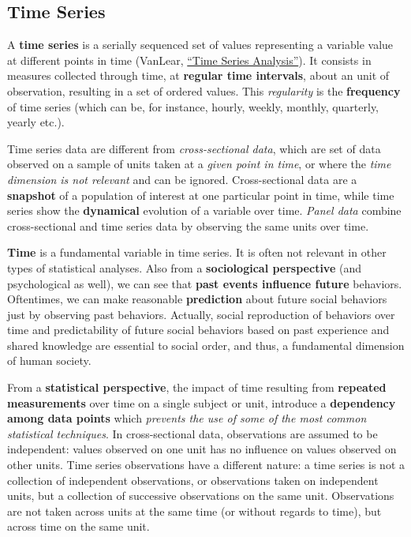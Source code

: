 \documentclass[
]{article}
\begin{document}
\subsection{Time Series}\label{time-series}

A \textbf{time series} is a serially sequenced set of values representing a variable value at different points in time (VanLear, \href{https://us.sagepub.com/en-us/nam/the-sage-encyclopedia-of-communication-research-methods/book244974}{``Time Series Analysis''}). It consists in measures collected through time, at \textbf{regular time intervals}, about an unit of observation, resulting in a set of ordered values. This \emph{regularity} is the \textbf{frequency} of time series (which can be, for instance, hourly, weekly, monthly, quarterly, yearly etc.).

Time series data are different from \emph{cross-sectional data}, which are set of data observed on a sample of units taken at a \emph{given point in time}, or where the \emph{time dimension is not relevant} and can be ignored. Cross-sectional data are a \textbf{snapshot} of a population of interest at one particular point in time, while time series show the \textbf{dynamical} evolution of a variable over time. \emph{Panel data} combine cross-sectional and time series data by observing the same units over time.

\textbf{Time} is a fundamental variable in time series. It is often not relevant in other types of statistical analyses. Also from a \textbf{sociological perspective} (and psychological as well), we can see that \textbf{past events influence future} behaviors. Oftentimes, we can make reasonable \textbf{prediction} about future social behaviors just by observing past behaviors. Actually, social reproduction of behaviors over time and predictability of future social behaviors based on past experience and shared knowledge are essential to social order, and thus, a fundamental dimension of human society.

From a \textbf{statistical perspective}, the impact of time resulting from \textbf{repeated measurements} over time on a single subject or unit, introduce a \textbf{dependency among data points} which \emph{prevents the use of some of the most common statistical techniques}. In cross-sectional data, observations are assumed to be independent: values observed on one unit has no influence on values observed on other units. Time series observations have a different nature: a time series is not a collection of independent observations, or observations taken on independent units, but a collection of successive observations on the same unit. Observations are not taken across units at the same time (or without regards to time), but across time on the same unit.
\end{document}
